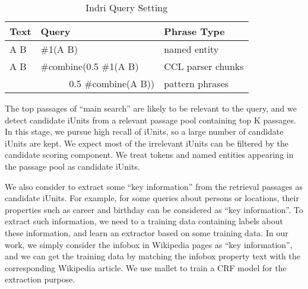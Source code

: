\begin{table}
\caption{Indri Query Setting}
\label{table:query}

\centering
\begin{tabular}{|l|l|l|}
\hline
\bf{Text} & \bf{Query} & \bf{Phrase Type} \\
\hline
\hline
A B & \#1(A B) & named entity \\
\hline
A B & \#combine(0.5 \#1(A B)  & CCL parser chunks \\
    & \ \ \ \ \ \ 0.5 \#combine(A B))     & pattern phrases \\
\hline

\end{tabular}

\end{table}



The top passages of ``main search''  are likely to be relevant to the query, and we detect candidate iUnits from a relevant passage pool containing top K passages.
In this stage, we pursue high recall of iUnits, so a large number of candidate iUnits are kept.
We expect most of the irrelevant iUnits can be filtered by the candidate scoring component.
We treat tokens and named entities appearing in the passage pool as candidate iUnits.


We also consider to extract some ``key information'' from the retrieval passages as candidate iUnits.
For example, for some queries about persons or locations, their properties such as career and birthday can be considered as ``key information''.
To extract such information, we need to a training data containing labels about these information, and learn an extractor based on some training data.
In our work, we simply consider the infobox in Wikipedia pages as ``key information'', and we can get the training data by matching the infobox property text with the corresponding Wikipedia article.
We use mallet \cite{mccallum_02} to train a CRF model \cite{Lafferty_etal_ICML01} for the extraction purpose.
